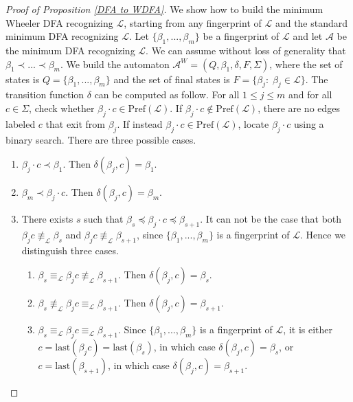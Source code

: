 \documentclass[runningheads]{llncs}
\newcommand{\pf}[1]{\text{Pref}(\mathcal #1)}
\begin{document}
\begin{proof}[\noindent Proof of Proposition \ref{DFA to WDFA}]
We show how to build the minimum Wheeler DFA recognizing $\mathcal L$, starting from any fingerprint of $\mathcal L$ and the standard minimum DFA recognizing $\mathcal L$. Let $\{ \beta_1, ..., \beta_m \}$ be a fingerprint of $\mathcal L$ and let $\mathcal A$ be the minimum DFA recognizing $\mathcal L$. We can assume without loss of generality that $\beta_1 \prec ... \prec \beta_m$. We build the automaton $\mathcal A^W=(Q, \beta_1, \delta, F,\Sigma)$, where the set of states is $Q = \{ \beta_1, ..., \beta_m \}$ and the set of final states is $F = \{ \beta_j:\; \beta_j \in \mathcal L \}$. The transition function $\delta$ can be computed as follow. For all $1 \le j \le m$ and for all $c \in \Sigma$, check whether $\beta_j \cdot c \in \pf L$. If $\beta_j \cdot c \notin \pf L$, there are no edges labeled $c$ that exit from $\beta_j$. If instead $\beta_j \cdot c \in \pf L$, locate $\beta_j \cdot c$ using a binary search. There are three possible cases.
\begin{enumerate}
    \item $\beta_j \cdot c \prec \beta_1$. Then $\delta(\beta_j, c) = \beta_1$.
\item $\beta_m \prec \beta_j \cdot c$. Then $\delta(\beta_j, c) = \beta_m$.
\item There exists $s$ such that $\beta_s \preceq \beta_j \cdot c \preceq \beta_{s+1}$. It can not be the case that both $\beta_jc \not\equiv_\mathcal L \beta_s$ and $\beta_jc \not\equiv_\mathcal L \beta_{s+1}$, since $\{ \beta_1, ..., \beta_m \}$ is a fingerprint of $\mathcal L$. Hence we distinguish three cases.
\begin{enumerate}
    \item $\beta_s \equiv_\mathcal L \beta_jc \not \equiv_\mathcal L \beta_{s+1}$. Then $\delta(\beta_j, c) = \beta_s$.
    \item $\beta_s \not\equiv_\mathcal L \beta_jc \equiv_\mathcal L \beta_{s+1}$. Then $\delta(\beta_j, c) = \beta_{s+1}$.
    \item $\beta_s \equiv_\mathcal L \beta_jc \equiv_\mathcal L \beta_{s+1}$. Since $\{ \beta_1, ..., \beta_m \}$ is a fingerprint of $\mathcal L$, it is either $c = \text{last}(\beta_jc) = \text{last}(\beta_s)$, in which case $\delta(\beta_j, c) = \beta_s$, or $c = \text{last}(\beta_{s+1})$, in which case $\delta(\beta_j, c) = \beta_{s+1}$.
\end{enumerate}
\end{enumerate}
\end{proof}

\vskip5mm
\end{document}
